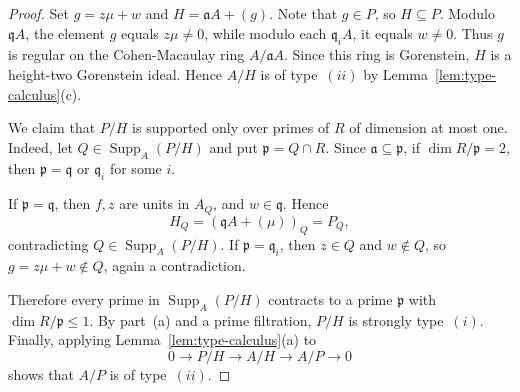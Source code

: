 \documentclass[11pt,letterpaper]{amsart}
\theoremstyle{plain}
\theoremstyle{definition}
\theoremstyle{remark}
\begin{document}
\begin{proof}
Set $g=z\mu+w$ and $H=\mathfrak aA+(g)$.
Note that $g\in P$, so $H\subseteq P$.
Modulo $\mathfrak qA$, the element $g$ equals
$z\mu\ne0$, while modulo each $\mathfrak q_iA$,
it equals $w\ne0$.
Thus $g$ is regular on the Cohen-Macaulay ring
$A/\mathfrak aA$. Since this ring is Gorenstein,
$H$ is a height-two Gorenstein ideal.
Hence $A/H$ is of type~$(ii)$ by
Lemma~\ref{lem:type-calculus}(c).

We claim that $P/H$ is supported only over primes of
$R$ of dimension at most one. Indeed, let
$Q\in\operatorname{Supp}_A(P/H)$ and put
$\mathfrak p=Q\cap R$. Since $\mathfrak a\subseteq\mathfrak p$,
if $\dim R/\mathfrak p=2$, then
$\mathfrak p=\mathfrak q$ or $\mathfrak q_i$ for some $i$.

If $\mathfrak p=\mathfrak q$, then $f,z$ are units in
$A_Q$, and $w\in\mathfrak q$. Hence
\[
H_Q=(\mathfrak qA+(\mu))_Q=P_Q,
\]
contradicting $Q\in\operatorname{Supp}_A(P/H)$.
If $\mathfrak p=\mathfrak q_i$, then
$z\in Q$ and $w\notin Q$, so $g=z\mu+w\notin Q$,
again a contradiction.

Therefore every prime in $\operatorname{Supp}_A(P/H)$
contracts to a prime $\mathfrak p$ with
$\dim R/\mathfrak p\leq1$. By part~(a) and a prime
filtration, $P/H$ is strongly type~$(i)$.
Finally, applying Lemma~\ref{lem:type-calculus}(a) to
\[
0\longrightarrow P/H\longrightarrow A/H
\longrightarrow A/P\longrightarrow0
\]
shows that $A/P$ is of type~$(ii)$.

\end{proof}
\end{document}
